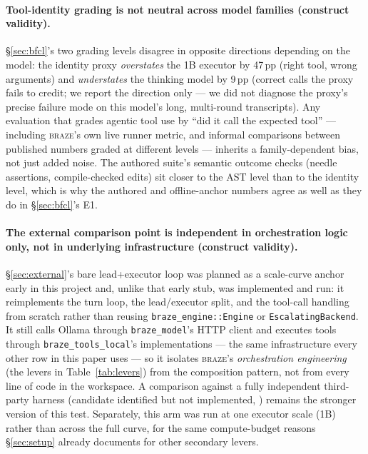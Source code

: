 \documentclass[smallcondensed,natbib]{svjour3}
\newcommand{\braze}{\textsc{braze}}
\begin{document}
\paragraph{Tool-identity grading is not neutral across model families
(construct validity).} \S\ref{sec:bfcl}'s two grading levels disagree
in opposite directions depending on the model: the identity proxy
\emph{overstates} the 1B executor by 47\,pp (right tool, wrong
arguments) and \emph{understates} the thinking model by 9\,pp
(correct calls the proxy fails to credit; we report the direction
only --- we did not diagnose the proxy's precise failure mode on
this model's long, multi-round transcripts). Any evaluation that
grades agentic tool use by ``did it call the expected tool'' ---
including \braze{}'s own live runner metric, and informal
comparisons between published numbers graded at different levels ---
inherits a family-dependent bias, not just added noise. The authored
suite's semantic outcome checks (needle assertions, compile-checked
edits) sit closer to the AST level than to the identity level, which
is why the authored and offline-anchor numbers agree as well as they
do in \S\ref{sec:bfcl}'s E1.

\paragraph{The external comparison point is independent in orchestration
logic only, not in underlying infrastructure (construct validity).} \S\ref{sec:external}'s
bare lead+executor loop was planned as a scale-curve anchor early in
this project and, unlike that early stub, was implemented and run: it
reimplements the turn loop, the lead/executor split, and the tool-call
handling from scratch rather than reusing \texttt{braze\_engine::Engine}
or \texttt{EscalatingBackend}. It still calls Ollama through
\texttt{braze\_model}'s HTTP client and executes tools through
\texttt{braze\_tools\_local}'s implementations --- the same
infrastructure every other row in this paper uses --- so it isolates
\braze{}'s \emph{orchestration engineering} (the levers in
Table~\ref{tab:levers}) from the composition pattern, not from every
line of code in the workspace. A comparison against a fully independent
third-party harness (candidate identified but not implemented,
\citep{pi-dev}) remains the stronger version of this test. Separately,
this arm was run at one executor scale (1B) rather than across the
full curve, for the same compute-budget reasons \S\ref{sec:setup}
already documents for other secondary levers.
\end{document}
